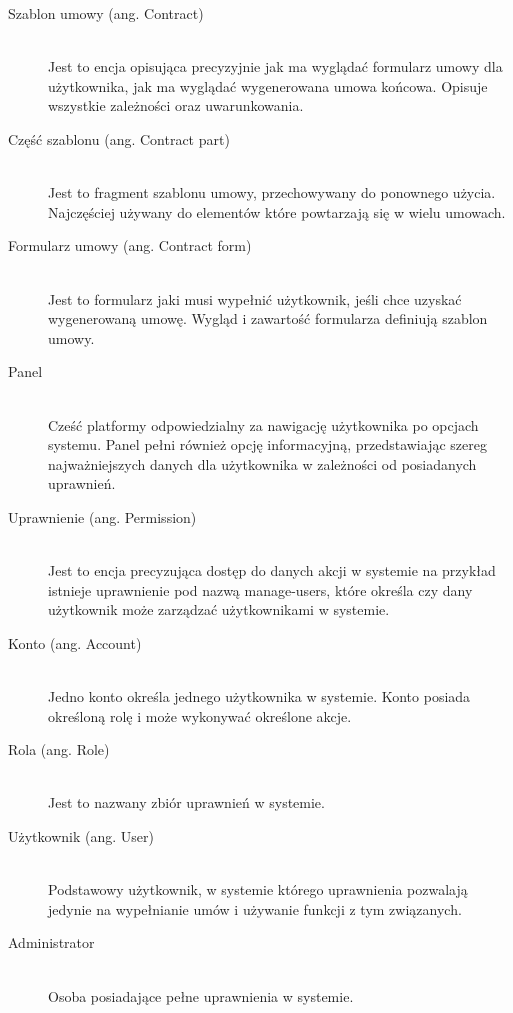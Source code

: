 \begin{description}
    \item[Szablon umowy (ang. Contract)] \hfill \\ Jest to encja opisująca precyzyjnie jak ma wyglądać formularz umowy dla użytkownika, jak ma wyglądać wygenerowana umowa końcowa. Opisuje wszystkie zależności oraz uwarunkowania. 

    \item[Część szablonu (ang. Contract part)] \hfill \\ Jest to fragment szablonu umowy, przechowywany do ponownego użycia. Najczęściej używany do elementów które powtarzają się w wielu umowach. 

    \item[Formularz umowy (ang. Contract form)] \hfill \\ Jest to formularz jaki musi wypełnić użytkownik, jeśli chce uzyskać wygenerowaną umowę. Wygląd i zawartość formularza definiują szablon umowy. 

    \item[Panel] \hfill \\ Cześć platformy odpowiedzialny za nawigację użytkownika po opcjach systemu. Panel pełni również opcję informacyjną, przedstawiając szereg najważniejszych danych dla użytkownika w zależności od posiadanych uprawnień. 

    \item[Uprawnienie (ang. Permission)] \hfill \\ Jest to encja precyzująca dostęp do danych akcji w systemie na przykład istnieje uprawnienie pod nazwą manage-users, które określa czy dany użytkownik może zarządzać użytkownikami w systemie. 

    \item[Konto (ang. Account)] \hfill \\ Jedno konto określa jednego użytkownika w systemie. Konto posiada określoną rolę i może wykonywać określone akcje. 

    \item[Rola (ang. Role)] \hfill \\ Jest to nazwany zbiór uprawnień w systemie. 

    \item[Użytkownik (ang. User)] \hfill \\ Podstawowy użytkownik, w systemie którego uprawnienia pozwalają jedynie na wypełnianie umów i używanie funkcji z tym związanych. 

    \item[Administrator] \hfill \\ Osoba posiadające pełne uprawnienia w systemie. 


\end{description}
